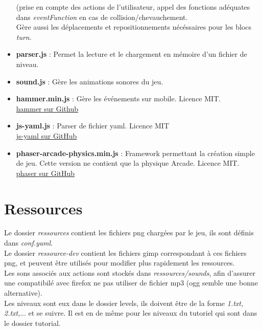 \documentclass[11pt]{article}
\begin{document}
\begin{itemize}
		(prise en compte des actions de l'utilisateur, appel des 
		fonctions adéquates dans {\em eventFunction} en cas de 
		collision/chevauchement.\\
		Gère aussi les déplacements et repositionnements nécéssaires 
		pour les blocs {\em turn}.\\
	\item
		\textbf{parser.js} : Permet la lecture et le chargement en 
		mémoire d'un fichier de niveau.\\
	\item
		\textbf{sound.js} : Gère les animations sonores du jeu.\\
	\item
		\textbf{hammer.min.js} : Gère les événements sur mobile. Licence
		MIT.\\
		\href{https://github.com/EightMedia/hammer.js}
		{hammer sur Github}\\
	\item
		\textbf{js-yaml.js} : Parser de fichier yaml. Licence MIT\\
		\href{https://github.com/nodeca/js-yaml}{js-yaml sur GitHub}\\
	\item
		\textbf{phaser-arcade-physics.min.js} : Framework permettant
		la création simple de jeu. Cette version ne contient que la 
		physique Arcade. Licence MIT.\\
		\href{https://github.com/photonstorm/phaser}
		{phaser sur GitHub}\\
\end{itemize}
\section {Ressources}
Le dossier {\em ressources} contient les fichiers png chargées par le jeu,
ils sont définis dans {\em conf.yaml}.\\
Le dossier {\em ressource-dev} contient les fichiers gimp correspondant à
ces fichiers png, et peuvent être utilisés pour modifier plus rapidement 
les ressources.\\
Les sons associés aux actions sont stockés dans {\em ressources/sounds}, afin 
d'assurer une compatibilé avec firefox ne pas utiliser de fichier mp3 (ogg
semble une bonne alternative).\\
Les niveaux sont eux dans le dossier levels, ils doivent être de la forme 
{\em 1.txt, 2.txt},... et se suivre. Il est en de même pour les niveaux du 
tutoriel qui sont dans le dossier tutorial.\\
\end{document}
